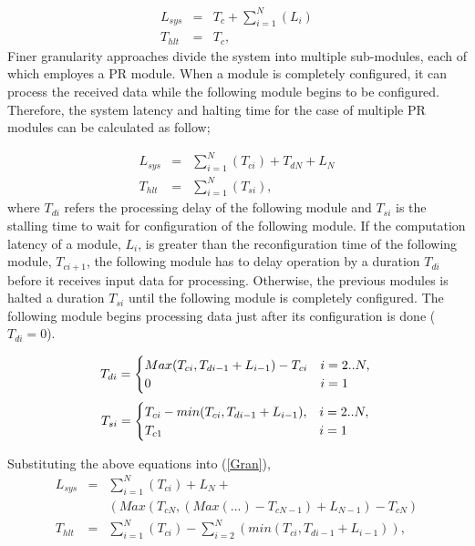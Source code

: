\begin{eqnarray}
\label{Mono}
L_{sys} &=& T_{c} + \sum_{i = 1}^{N}    (L_{i}) \nonumber \\
T_{hlt} &=& T_{c},
\end{eqnarray}
Finer granularity approaches divide the system into multiple sub-modules, each of which employes a PR module. When a module is completely configured, it can process the received data while the following module begins to be configured. Therefore, the system latency and halting time for the case of multiple PR modules can be calculated as follow;

\begin{eqnarray}
\label{Gran}
L_{sys} &=&  \sum_{i = 1}^{N} (T_{ci}) + T_{dN} + L_{N} \nonumber \\
T_{hlt} &=&  \sum_{i = 1}^{N}  (T_{si}),
\end{eqnarray}
where $T_{di}$ refers the processing delay of the following module and $T_{si}$ is the stalling time to wait for configuration of the following module. If the computation latency of a module, $L_{i}$, is greater than the reconfiguration time of the following module,  $T_{ci+1}$, the following module has to delay operation by a duration $T_{di}$ before it receives input data for processing. Otherwise, the previous modules is halted a duration $T_{si}$ until the following module is completely configured. The following module begins processing data just after its configuration is done ($T_{di} = 0$). 

\begin{equation}
\label{DelayTime}
T_{di} = \begin{cases} Max(T_{ci}, T_{di-1}+L_{i-1}) - T_{ci}  	& i = 2..N, \\ 
						0 										& i = 1 \end{cases}  \\ 
\end{equation}
\begin{equation}
\label{HaltTime}
T_{si} = \begin{cases} T_{ci} - min(T_{ci}, T_{di-1}+L_{i-1}), 	&  i = 2..N, \\ 
					  T_{c1}									&  i=1 \end{cases}  \\ 
\end{equation}

Substituting the above equations into (\ref{Gran}), 
\begin{eqnarray}
\label{Gran2}
L_{sys} &= & \sum_{i = 1}^{N}(T_{ci}) + L_{N} +   \nonumber \\
		& & (Max(T_{cN}, (Max( ... ) - T_{cN-1}) + L_{N-1}) - T_{cN})  \nonumber \\
T_{hlt} &= &\sum_{i = 1}^{N}(T_{ci})  -  \sum_{i = 2}^{N}  (min(T_{ci}, T_{di-1}+L_{i-1})),
\end{eqnarray}

